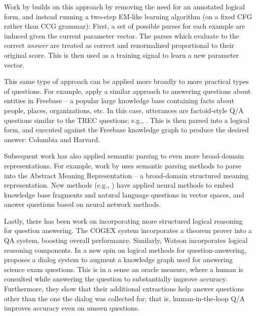 Work by  builds on this approach by removing the need for
  an annotated logical form, and instead running a two-step EM-like learning algorithm
  (on a fixed CFG rather than CCG grammar):
First, a set of possible parses for each example are induced given the current parameter vector.
The parses which evaluate to the correct \textit{answer} are treated as correct and renormalized
  proportional to their original score.
This is then used as a training signal to learn a new parameter vector.

This same type of approach can be applied more broadly to more practical types of questions.
For example,  apply a similar approach to answering
  questions about entities in Freebase -- a popular large knowledge base containing facts
  about people, places, organizations, etc.
In this case, utterances are factoid-style Q/A questions similar to the TREC questions;
  e.g., .
This is then parsed into a logical form, and executed against the Freebase knowledge graph
  to produce the desired answer: Columbia and Harvard.


Subsequent work has also applied semantic parsing to even more broad-domain representations.
For example, work by  uses semantic parsing methods to parse into
  the Abstract Meaning Representation \cite{key:2013banarescu-amr} -- a 
  broad-domain structured meaning representation.
New methods (e.g., ) have applied neural methods
  to embed knowledge base fragments and natural language questions in vector spaces,
   and answer questions based on neural network methods.

Lastly, there has been work on incorporating more structured logical
  reasoning for question answering.
The COGEX system \cite{key:2003moldovan-trec} incorporates a theorem
  prover into a QA system, boosting overall performance.
Similarly, Watson \cite{key:2010ferrucci-watson} incorporates
  logical reasoning components.
In a new spin on logical methods for question-answering,
   proposes
  a dialog system to augment a knowledge graph used for answering science exam
  questions.
This is in a sense an oracle measure, where a human is consulted while answering
  the question to substantially improve accuracy.
Furthermore, they show that their additional extractions help
  answer questions other than the one the dialog was collected for;
  that is, human-in-the-loop Q/A improves accuracy even on unseen questions.

